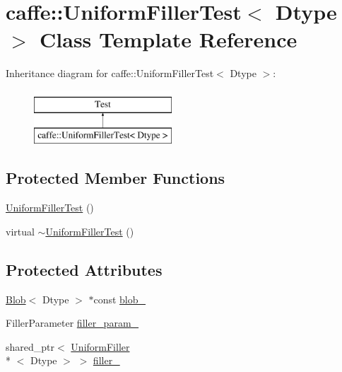 \hypertarget{classcaffe_1_1_uniform_filler_test}{\section{caffe\+:\+:Uniform\+Filler\+Test$<$ Dtype $>$ Class Template Reference}
\label{classcaffe_1_1_uniform_filler_test}
}
Inheritance diagram for caffe\+:\+:Uniform\+Filler\+Test$<$ Dtype $>$\+:\begin{figure}[H]
\begin{center}
\leavevmode
\includegraphics[height=2.000000cm]{classcaffe_1_1_uniform_filler_test}
\end{center}
\end{figure}
\subsection*{Protected Member Functions}
\begin{DoxyCompactItemize}
\item 
\hyperlink{classcaffe_1_1_uniform_filler_test_a29d2f404def00d07d24cd1016a599a4a}{Uniform\+Filler\+Test} ()
\item 
virtual \hyperlink{classcaffe_1_1_uniform_filler_test_aed6f0439e76c27300e553bd28701df32}{$\sim$\+Uniform\+Filler\+Test} ()
\end{DoxyCompactItemize}
\subsection*{Protected Attributes}
\begin{DoxyCompactItemize}
\item 
\hyperlink{classcaffe_1_1_blob}{Blob}$<$ Dtype $>$ $\ast$const \hyperlink{classcaffe_1_1_uniform_filler_test_ad11a8f8e30835ae07340deb3663a21cc}{blob\+\_\+}
\item 
Filler\+Parameter \hyperlink{classcaffe_1_1_uniform_filler_test_a1639040ac615a5a4a13df866159aa041}{filler\+\_\+param\+\_\+}
\item 
shared\+\_\+ptr$<$ \hyperlink{classcaffe_1_1_uniform_filler}{Uniform\+Filler}\\*
$<$ Dtype $>$ $>$ \hyperlink{classcaffe_1_1_uniform_filler_test_a0f449053d9c3cd3103c2aa4fe807c9dc}{filler\+\_\+}
\end{DoxyCompactItemize}


